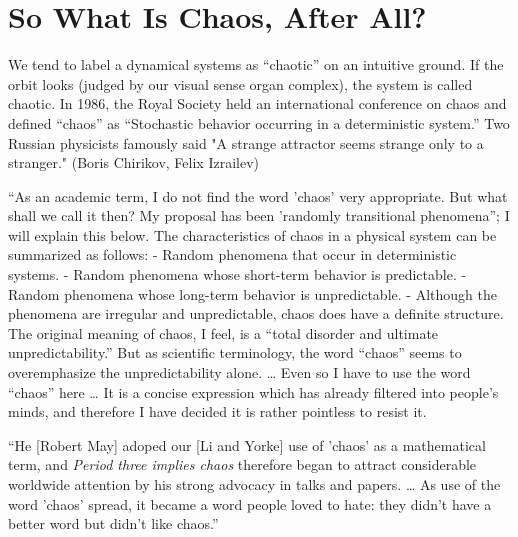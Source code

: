 \documentclass[12pt,twoside]{book}
\begin{document}
\section{So What Is Chaos, After All?}
We tend to label a dynamical systems as ``chaotic'' on an intuitive ground.
If the orbit looks (judged by our visual sense organ complex), the system is called chaotic.
In 1986, the Royal Society held an international conference on chaos and defined ``chaos'' as ``Stochastic behavior occurring in a deterministic system.'' \cite{stewart}
Two Russian physicists famously said "A strange attractor seems strange only to a stranger."
(Boris Chirikov, Felix Izrailev)\cite{lorentzbook}

``As an academic term, I do not find the word 'chaos' very appropriate.
But what shall we call it then?
My proposal has been 'randomly transitional phenomena''; I will explain this below.
The characteristics of chaos in a physical system can be summarized as follows:
- Random phenomena that occur in deterministic systems.
- Random phenomena whose short-term behavior is predictable.
- Random phenomena whose long-term behavior is unpredictable.
- Although the phenomena are irregular and unpredictable, chaos does have a definite structure.
The original meaning of chaos, I feel, is a ``total disorder and ultimate unpredictability.''
But as scientific terminology, the word ``chaos'' seems to overemphasize the unpredictability alone.
\ldots
Even so I have to use the word ``chaos'' here \ldots
It is a concise expression which has already filtered into people's minds, and therefore I have decided it is rather pointless to resist it.

\citep[24]{ueda-abraham}

``He [Robert May] adoped our [Li and Yorke] use of 'chaos' as a mathematical term, and \textit{Period three implies chaos} therefore began to attract considerable worldwide attention by his strong advocacy in talks and papers.
\ldots
As use of the word 'chaos' spread, it became a word people loved to hate: they didn't have a better word but didn't like chaos.''
\citep[205]{ueda-abraham}


\end{document}
